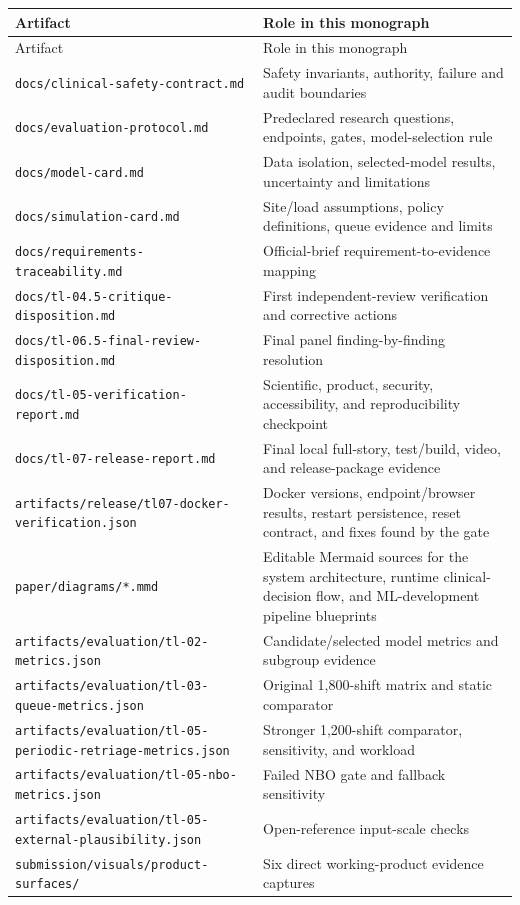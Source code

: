 \documentclass[11pt,a4paper]{article}
\newcommand{\code}[1]{\nolinkurl{#1}}
\begin{document}
\begin{longtable}{@{}L{54mm}L{104mm}@{}}
\toprule
Artifact & Role in this monograph \\
\midrule
\endfirsthead
\toprule
Artifact & Role in this monograph \\
\midrule
\endhead
\code{docs/clinical-safety-contract.md} & Safety invariants, authority, failure and audit boundaries \\
\code{docs/evaluation-protocol.md} & Predeclared research questions, endpoints, gates, model-selection rule \\
\code{docs/model-card.md} & Data isolation, selected-model results, uncertainty and limitations \\
\code{docs/simulation-card.md} & Site/load assumptions, policy definitions, queue evidence and limits \\
\code{docs/requirements-traceability.md} & Official-brief requirement-to-evidence mapping \\
\code{docs/tl-04.5-critique-disposition.md} & First independent-review verification and corrective actions \\
\code{docs/tl-06.5-final-review-disposition.md} & Final panel finding-by-finding resolution \\
\code{docs/tl-05-verification-report.md} & Scientific, product, security, accessibility, and reproducibility checkpoint \\
\code{docs/tl-07-release-report.md} & Final local full-story, test/build, video, and release-package evidence \\
\code{artifacts/release/tl07-docker-verification.json} & Docker versions, endpoint/browser results, restart persistence, reset contract, and fixes found by the gate \\
\code{paper/diagrams/*.mmd} & Editable Mermaid sources for the system architecture, runtime clinical-decision flow, and ML-development pipeline blueprints \\
\code{artifacts/evaluation/tl-02-metrics.json} & Candidate/selected model metrics and subgroup evidence \\
\code{artifacts/evaluation/tl-03-queue-metrics.json} & Original 1,800-shift matrix and static comparator \\
\code{artifacts/evaluation/tl-05-periodic-retriage-metrics.json} & Stronger 1,200-shift comparator, sensitivity, and workload \\
\code{artifacts/evaluation/tl-05-nbo-metrics.json} & Failed NBO gate and fallback sensitivity \\
\code{artifacts/evaluation/tl-05-external-plausibility.json} & Open-reference input-scale checks \\
\code{submission/visuals/product-surfaces/} & Six direct working-product evidence captures \\
\bottomrule
\end{longtable}
\end{document}
